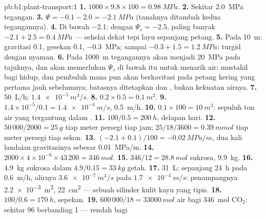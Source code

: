 \begin{solution}{pb:b1:plant-transport:1}
\textbf{1.} $1000\times 9.8\times 100 = \qty{0.98}{MPa}$.
\textbf{2.} Sekitar \qty{2.0}{MPa} tegangan.
\textbf{3.} $\Psi = -0.1 - 2.0 = \qty{-2.1}{MPa}$ (tanahnya ditambah
kedua tegangannya).
\textbf{4.} Di bawah \qty{-2.1}{}: dengan $\Psi_s = -2.5$, 
paling banyak $-2.1 + 2.5 = \qty{0.4}{MPa}$ --- sehelai  dekat tepi
layu sepanjang petang.
\textbf{5.} Pada \qty{10}{m}: gravitasi \qty{0.1}{}, gesekan
\qty{0.1}{},  \qty{-0.3}{MPa};  
sampai $-0.3 + 1.5 = \qty{1.2}{MPa}$: turgid dengan nyaman.
\textbf{6.} Pada \qty{1000}{m} tegangannya akan menjadi \qty{20}{MPa}
pada tajuknya, dan  akan memerlukan $\Psi_s$ di bawah itu untuk
menarik air: mustahil bagi  hidup, dan pembuluh mana pun akan
berkavitasi pada petang kering yang pertama jauh sebelumnya; batasnya
ditetapkan  dan , bukan kekuatan airnya.
\textbf{7.} \qty{50}{L/h}; $\qty{1.4e-5}{m^3/s}$.
\textbf{8.} $0.2\times 0.5 = \qty{0.1}{m^2}$.
\textbf{9.} $1.4\times 10^{-5}/0.1 = \qty{1.4e-4}{m/s}$, \qty{0.5}{m/h}.
\textbf{10.} $0.1\times 100 = \qty{10}{m^3}$: sepuluh ton air yang tergantung dalam .
\textbf{11.} $100/0.5 = \qty{200}{h}$, delapan hari.
\textbf{12.} $50\,000/2000 = \qty{25}{g}$ tiap meter persegi tiap jam;
$25/18/3600 = \qty{0.39}{mmol}$ tiap meter persegi tiap sekon.
\textbf{13.} $(-2.1 + 0.1)/100 = \qty{-0.02}{MPa/m}$, dua kali landaian
gravitasinya sebesar \qty{0.01}{MPa/m}.
\textbf{14.} $2000\times 4\times 10^{-6}\times 43\,200 = \qty{346}{mol}$.
\textbf{15.} $346/12 = \qty{28.8}{mol}$ sukrosa, \qty{9.9}{kg}.
\textbf{16.} \qty{4.9}{kg} sukrosa dalam $4.9/0.15 = \qty{33}{kg}$
getah.
\textbf{17.} \qty{31}{L}; sepanjang \qty{24}{h} pada \qty{0.6}{m/h},
alirnya $\qty{3.6e-7}{m^3/s}$ pada $\qty{1.7e-4}{m/s}$: penampangnya
\qty{2.2e-3}{m^2}, \qty{22}{cm^2}  --- sebuah silinder
kulit kayu yang tipis.
\textbf{18.} $100/0.6 = \qty{170}{h}$, sepekan.
\textbf{19.} $600\,000/18 = \qty{33000}{mol}$ air bagi
\qty{346}{mol} $\mathrm{CO_2}$: sekitar 96 berbanding 1 --- rendah bagi

\end{solution}
